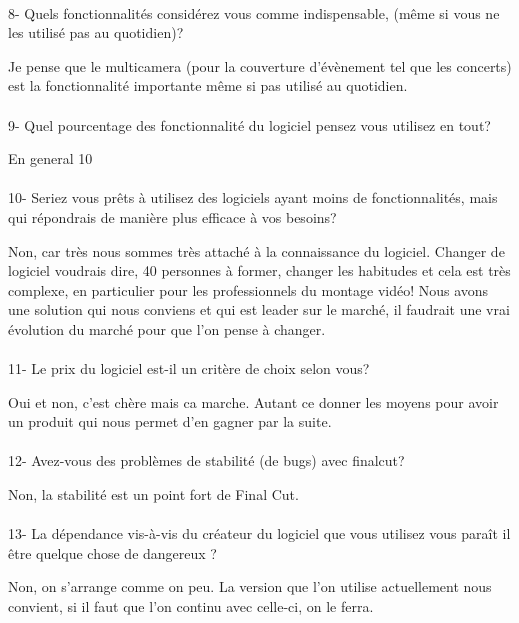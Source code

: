 \paragraph{}
8-  Quels fonctionnalités considérez vous comme indispensable, (même si vous
ne les utilisé pas au quotidien)?

Je pense que le multicamera (pour la couverture d'évènement tel que les
concerts) est la fonctionnalité importante même si pas utilisé au quotidien.

\paragraph{}
9- Quel pourcentage des fonctionnalité du logiciel pensez vous utilisez
en tout?

En general 10%

\paragraph{}
10- Seriez vous prêts à utilisez des logiciels ayant moins de
fonctionnalités, mais qui répondrais de manière plus efficace
à vos besoins?

Non, car très nous sommes très attaché à la connaissance du logiciel.
Changer de logiciel voudrais dire, 40 personnes à former, changer les
habitudes et cela est très complexe, en particulier pour les professionnels
du montage vidéo! Nous avons une solution qui nous conviens et qui est leader
sur le marché, il faudrait une vrai évolution du marché pour que l'on pense à
changer.

\paragraph{}
11-  Le prix du logiciel est-il un critère de choix selon vous?

Oui et non, c'est chère mais ca marche. Autant ce donner les moyens pour avoir
un produit qui nous permet d'en gagner par la suite.

\paragraph{}
12- Avez-vous des problèmes de stabilité (de bugs) avec finalcut?

Non, la stabilité est un point fort de Final Cut.

\paragraph{}
13- La dépendance vis-à-vis du créateur du logiciel que vous utilisez
vous paraît il être quelque chose de dangereux ?

Non, on s'arrange comme on peu. La version que l'on utilise actuellement
nous convient, si il faut que l'on continu avec celle-ci, on le ferra.
